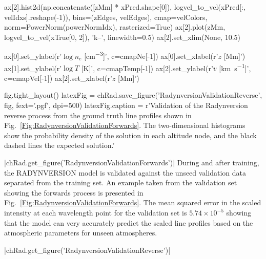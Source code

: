 \begin{pycode}[Radynversion]
ax[2].hist2d(np.concatenate([zMm] * xPred.shape[0]),
             logvel_to_vel(xPred[:, velIdxs].reshape(-1)),
             bins=(zEdges, velEdges), cmap=velColors, norm=PowerNorm(powerNormIdx), rasterized=True)
ax[2].plot(zMm, logvel_to_vel(xTrue[0, 2]), 'k--', linewidth=0.5)
ax[2].set_xlim(None, 10.5)


ax[0].set_ylabel(r'$\log{n_e}$ [\si{\cm\tothe{-3}}]', c=cmapNe[-1])
ax[0].set_xlabel(r'$z$ [\si{\mega\metre}]')
ax[1].set_ylabel(r'$\log{T}$ [\si{\K}]', c=cmapTemp[-1])
ax[2].set_ylabel(r'$v$ [\si{\kilo\metre\per\second}]', c=cmapVel[-1])
ax[2].set_xlabel(r'$z$ [\si{\mega\metre}]')

fig.tight_layout()
latexFig = chRad.save_figure('RadynversionValidationReverse', fig, fext='.pgf', dpi=500)
latexFig.caption = r'Validation of the Radynversion reverse process from the ground truth line profiles shown in Fig.~\ref{Fig:RadynversionValidationForwards}. The two-dimensional histograms show the probability density of the solution in each altitude node, and the black dashed lines the expected solution.'
\end{pycode}

\py[Radynversion]|chRad.get_figure('RadynversionValidationForwards')|
During and after training, the RADYNVERSION model is validated against the unseed validation data separated from the training set.
An example taken from the validation set showing the forwards process is presented in Fig.~\ref{Fig:RadynversionValidationForwards}.
The mean squared error in the scaled intensity at each wavelength point for the validation set is $5.74\times10^{-5}$ showing that the model can very accurately predict the scaled line profiles based on the atmospheric parameters for unseen atmospheres.

\py[Radynversion]|chRad.get_figure('RadynversionValidationReverse')|

